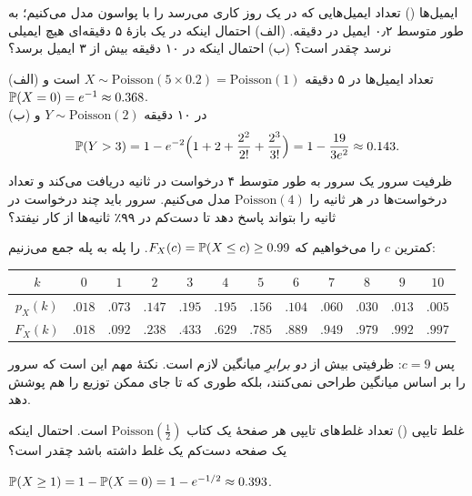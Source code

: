 \begin{example}[label=ex:emails]{ایمیل‌ها ()}
تعداد ایمیل‌هایی که در یک روز کاری می‌رسد را با پواسون مدل می‌کنیم؛ به طور متوسط ۰٫۲ ایمیل در دقیقه. (الف) احتمال اینکه در یک بازهٔ ۵ دقیقه‌ای هیچ ایمیلی نرسد چقدر است؟ (ب) احتمال اینکه در ۱۰ دقیقه بیش از ۳ ایمیل برسد؟
\begin{solution}
(الف) تعداد ایمیل‌ها در ۵ دقیقه $X\sim\mathrm{Poisson}(5\times0.2)=\mathrm{Poisson}(1)$ است و $\P(X=0)=e^{-1}\approx0.368$.\\
(ب) در ۱۰ دقیقه $Y\sim\mathrm{Poisson}(2)$ و
\[ \P(Y>3)=1-e^{-2}\Bigl(1+2+\frac{2^2}{2!}+\frac{2^3}{3!}\Bigr)=1-\frac{19}{3e^2}\approx0.143. \]
\end{solution}
\end{example}

\begin{example}[label=ex:server]{ظرفیت سرور}
یک سرور به طور متوسط ۴ درخواست در ثانیه دریافت می‌کند و تعداد درخواست‌ها در هر ثانیه را $\mathrm{Poisson}(4)$ مدل می‌کنیم. سرور باید چند درخواست در ثانیه را بتواند پاسخ دهد تا دست‌کم در ۹۹٪ ثانیه‌ها از کار نیفتد؟
\begin{solution}
کمترین $c$ را می‌خواهیم که $F_X(c)=\P(X\le c)\ge0.99$.  را پله به پله جمع می‌زنیم:
\begin{center}
\renewcommand{\arraystretch}{1.2}
\small
\begin{tabular}{c|ccccccccccc}
$k$ & $0$ & $1$ & $2$ & $3$ & $4$ & $5$ & $6$ & $7$ & $8$ & $9$ & $10$\\\hline
$p_X(k)$ & $.018$ & $.073$ & $.147$ & $.195$ & $.195$ & $.156$ & $.104$ & $.060$ & $.030$ & $.013$ & $.005$\\
$F_X(k)$ & $.018$ & $.092$ & $.238$ & $.433$ & $.629$ & $.785$ & $.889$ & $.949$ & $.979$ & $\mathbf{.992}$ & $.997$
\end{tabular}
\end{center}
پس $c=9$: ظرفیتی بیش از \emph{دو برابرِ} میانگین لازم است. نکتهٔ مهم این است که سرور را بر اساس میانگین طراحی نمی‌کنند، بلکه طوری که تا جای ممکن \emph{} توزیع را هم پوشش دهد.
\end{solution}
\end{example}

\begin{example}[label=ex:typos]{غلط تایپی ()}
تعداد غلط‌های تایپی هر صفحهٔ یک کتاب $\mathrm{Poisson}(\tfrac12)$ است. احتمال اینکه یک صفحه دست‌کم یک غلط داشته باشد چقدر است؟
\begin{solution}
$\P(X\ge1)=1-\P(X=0)=1-e^{-1/2}\approx0.393$.
\end{solution}
\end{example}

